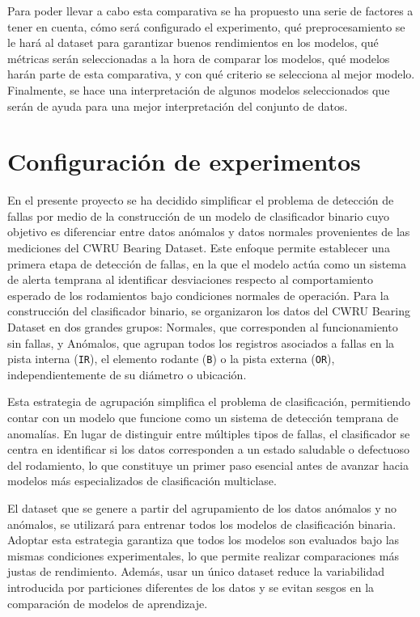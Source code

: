 \documentclass[11pt,a4paper,spanish]{book}
\numberwithin{equation}{chapter}
\numberwithin{figure}{chapter}
\begin{document}
Para poder llevar a cabo esta comparativa se ha propuesto una serie de factores a tener en cuenta, cómo será configurado el experimento, qué preprocesamiento se le hará al dataset para garantizar buenos rendimientos en los modelos, qué métricas serán seleccionadas a la hora de comparar los modelos, qué modelos harán parte de esta comparativa, y con qué criterio se selecciona al mejor modelo. Finalmente, se hace una interpretación de algunos modelos seleccionados que serán de ayuda para una mejor interpretación del conjunto de datos. 


\section{Configuración de experimentos}

 En el presente proyecto se ha decidido simplificar el problema de detección de fallas por medio de la construcción de un modelo de clasificador binario cuyo objetivo es diferenciar entre datos anómalos y datos normales provenientes de las mediciones del CWRU Bearing Dataset. Este enfoque permite establecer una primera etapa de detección de fallas, en la que el modelo actúa como un sistema de alerta temprana al identificar desviaciones respecto al comportamiento esperado de los rodamientos bajo condiciones normales de operación.
Para la construcción del clasificador binario, se organizaron los datos del CWRU Bearing Dataset en dos grandes grupos: Normales, que corresponden al funcionamiento sin fallas, y Anómalos,  que agrupan todos los registros asociados a fallas en la pista interna (\texttt{IR}), el elemento rodante (\texttt{B}) o la pista externa (\texttt{OR}), independientemente de su diámetro o ubicación.


Esta estrategia de agrupación simplifica el problema de clasificación, permitiendo contar con un modelo que funcione como un sistema de detección temprana de anomalías. En lugar de distinguir entre múltiples tipos de fallas, el clasificador se centra en identificar si los datos corresponden a un estado saludable o defectuoso del rodamiento, lo que constituye un primer paso esencial antes de avanzar hacia modelos más especializados de clasificación multiclase.


El dataset que se genere a partir del agrupamiento de los datos anómalos y no anómalos, se utilizará para entrenar todos los modelos de clasificación binaria. Adoptar esta estrategia garantiza que todos los modelos son evaluados bajo las mismas condiciones experimentales, lo que permite realizar comparaciones más justas de rendimiento. Además, usar un único dataset reduce la variabilidad introducida por particiones diferentes de los datos y se evitan sesgos en la comparación de modelos de aprendizaje.
\end{document}
